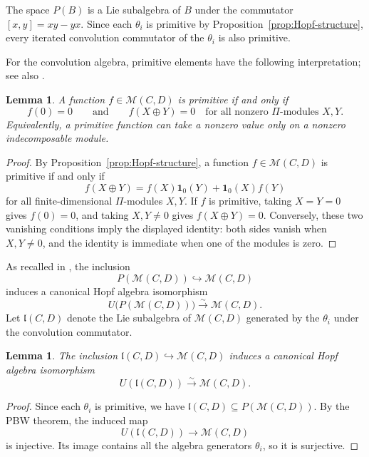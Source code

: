 \documentclass[12pt,reqno]{amsart}
\numberwithin{equation}{section}
\newtheorem{lemma}[theorem]{Lemma}
\theoremstyle{definition}
\theoremstyle{remark}
\theoremstyle{plain}
\theoremstyle{plain}
\begin{document}
   The space $P(B)$ is a Lie subalgebra of $B$ under the commutator $[x,y]=xy-yx$. 
   Since each $\theta_i$ is primitive by Proposition~\ref{prop:Hopf-structure}, every iterated convolution commutator of the $\theta_i$ is also primitive.

   For the convolution algebra, primitive elements have the following interpretation; see also \cite[Section~2.5]{GLS18}.

   \begin{lemma}\label{lem:primitive-support}
   A function $f\in\mathcal M(C,D)$ is primitive if and only if
   \[
   f(0)=0 \qquad\text{and}\qquad f(X\oplus Y)=0 \quad\text{for all nonzero $\Pi$-modules $X,Y$}.
   \]
   Equivalently, a primitive function can take a nonzero value only on a nonzero indecomposable module.
\end{lemma}

\begin{proof}
    By Proposition~\ref{prop:Hopf-structure}, a function $f\in\mathcal M(C,D)$ is primitive if and only if
\[
   f(X\oplus Y)
   =
   f(X)\mathbf1_0(Y)+\mathbf1_0(X)f(Y)
\]
   for all finite-dimensional $\Pi$-modules $X,Y$. If $f$ is primitive, taking $X=Y=0$ gives $f(0)=0$, and taking $X,Y\ne0$ gives $f(X\oplus Y)=0$. Conversely, these two vanishing conditions imply the displayed identity: both sides vanish when $X,Y\ne0$, and the identity is immediate when one of the modules is zero.
\end{proof}
   As recalled in \cite[Section~2.5]{GLS18}, the inclusion
\[
  P(\mathcal M(C,D))\hookrightarrow\mathcal M(C,D)
\]
  induces a canonical Hopf algebra isomorphism
\[
  U\bigl(P(\mathcal M(C,D))\bigr) \xrightarrow{\sim} \mathcal M(C,D).
\]
Let $\mathfrak l(C,D)$ denote the Lie subalgebra of $\mathcal M(C,D)$ generated by the $\theta_i$ under the convolution commutator.
\begin{lemma}\label{lem:enveloping-realization}
    The inclusion $\mathfrak l(C,D)\hookrightarrow\mathcal M(C,D)$ induces a canonical Hopf algebra isomorphism
\[
    U(\mathfrak l(C,D))\xrightarrow{\sim}\mathcal M(C,D).
\]
\end{lemma}
\begin{proof}
    Since each $\theta_i$ is primitive, we have $\mathfrak l(C,D)\subseteq P(\mathcal M(C,D))$. By the PBW theorem, the induced map
    \[
    U(\mathfrak l(C,D))\longrightarrow\mathcal M(C,D)
\]
is injective. Its image contains all the algebra generators $\theta_i$, so it is surjective. 
\end{proof}
\end{document}
